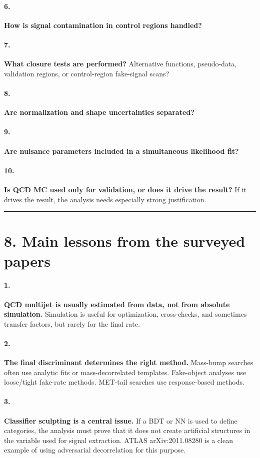 \documentclass[11pt]{article}
\begin{document}
\paragraph{6.} \textbf{How is signal contamination in control regions handled?}
\paragraph{7.} \textbf{What closure tests are performed?} Alternative functions, pseudo-data, validation regions, or control-region fake-signal scans?
\paragraph{8.} \textbf{Are normalization and shape uncertainties separated?}
\paragraph{9.} \textbf{Are nuisance parameters included in a simultaneous likelihood fit?}
\paragraph{10.} \textbf{Is QCD MC used only for validation, or does it drive the result?} If it drives the result, the analysis needs especially strong justification.

\bigskip\hrule\bigskip

\section{8. Main lessons from the surveyed papers}

\paragraph{1.} \textbf{QCD multijet is usually estimated from data, not from absolute simulation.} Simulation is useful for optimization, cross-checks, and sometimes transfer factors, but rarely for the final rate.

\paragraph{2.} \textbf{The final discriminant determines the right method.} Mass-bump searches often use analytic fits or mass-decorrelated templates. Fake-object analyses use loose/tight fake-rate methods. MET-tail searches use response-based methods.

\paragraph{3.} \textbf{Classifier sculpting is a central issue.} If a BDT or NN is used to define categories, the analysis must prove that it does not create artificial structures in the variable used for signal extraction. ATLAS arXiv:2011.08280 is a clean example of using adversarial decorrelation for this purpose.
\end{document}
